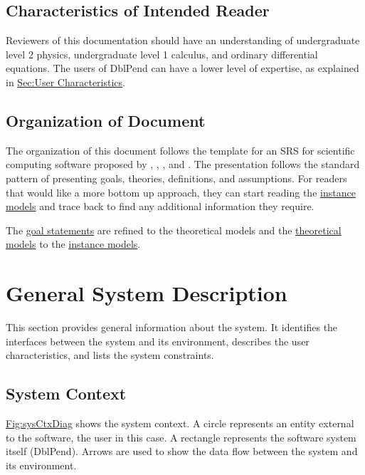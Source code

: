 \documentclass[12pt]{article}
\begin{document}
\subsection{Characteristics of Intended Reader}
\label{Sec:ReaderChars}
Reviewers of this documentation should have an understanding of undergraduate level 2 physics, undergraduate level 1 calculus, and ordinary differential equations. The users of DblPend can have a lower level of expertise, as explained in \hyperref[Sec:UserChars]{Sec:User Characteristics}.

\subsection{Organization of Document}
\label{Sec:DocOrg}
The organization of this document follows the template for an SRS for scientific computing software proposed by \cite{koothoor2013}, \cite{smithLai2005}, \cite{smithEtAl2007}, and \cite{smithKoothoor2016}. The presentation follows the standard pattern of presenting goals, theories, definitions, and assumptions. For readers that would like a more bottom up approach, they can start reading the \hyperref[Sec:IMs]{instance models} and trace back to find any additional information they require.

The \hyperref[Sec:GoalStmt]{goal statements} are refined to the theoretical models and the \hyperref[Sec:TMs]{theoretical models} to the \hyperref[Sec:IMs]{instance models}.

\section{General System Description}
\label{Sec:GenSysDesc}
This section provides general information about the system. It identifies the interfaces between the system and its environment, describes the user characteristics, and lists the system constraints.

\subsection{System Context}
\label{Sec:SysContext}
\hyperref[Figure:sysCtxDiag]{Fig:sysCtxDiag} shows the system context. A circle represents an entity external to the software, the user in this case. A rectangle represents the software system itself (DblPend). Arrows are used to show the data flow between the system and its environment.
\end{document}
